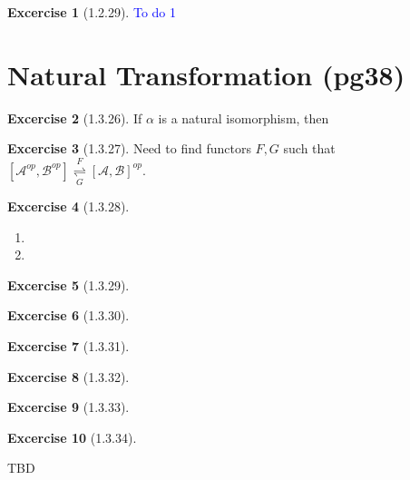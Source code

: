 \documentclass{article}
\theoremstyle{definition}
\newtheorem*{excercise}{Excercise}
\begin{document}
\begin{excercise}[1.2.29] %
		\item \textcolor{blue}{To do 1}
\end{excercise}

\section{Natural Transformation (pg38)}

\begin{excercise}[1.3.26] %
	If $\alpha$ is a natural isomorphism, then

\end{excercise}

\begin{excercise}[1.3.27] %
Need to find functors $F,G$  such that
$[\mathcal{A}^{op},\mathcal{B}^{op}] \overset{F}{\underset{G}{\rightleftharpoons}}[ \mathcal{A} ,\mathcal{B} ]^{op} $.

\end{excercise}

\begin{excercise}[1.3.28] %
		\begin{enumerate}[label=(\alph*)]
			\item
			\item
		\end{enumerate}

\end{excercise}

\begin{excercise}[1.3.29] %


\end{excercise}

\begin{excercise}[1.3.30] %

\end{excercise}

\begin{excercise}[1.3.31] %

\end{excercise}

\begin{excercise}[1.3.32] %

\end{excercise}

\begin{excercise}[1.3.33] %

\end{excercise}

\begin{excercise}[1.3.34] %

\end{excercise}




\pagebreak
TBD
\end{document}
